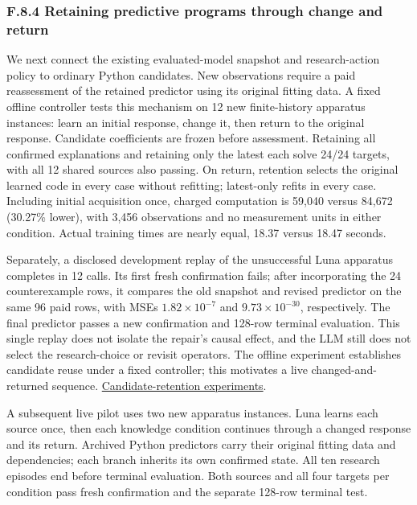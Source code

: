 \documentclass[twoside,11pt]{article}
\begin{document}
\subsubsection*{F.8.4 Retaining predictive programs through change and return}

We next connect the existing evaluated-model snapshot and research-action policy
to ordinary Python candidates. New observations require a paid reassessment of
the retained predictor using its original fitting data. A fixed offline controller
tests this mechanism on 12 new finite-history apparatus instances: learn an initial
response, change it, then return to the original response. Candidate coefficients
are frozen before assessment. Retaining all confirmed explanations and retaining
only the latest each solve 24/24 targets, with all 12 shared sources also passing.
On return, retention selects the original learned code in every case without
refitting; latest-only refits in every case. Including initial acquisition once,
charged computation is 59,040 versus 84,672 (30.27\% lower), with 3,456 observations
and no measurement units in either condition. Actual training times are nearly
equal, 18.37 versus 18.47 seconds.


Separately, a disclosed development replay of the unsuccessful Luna apparatus
completes in 12 calls. Its first fresh confirmation fails; after incorporating the
24 counterexample rows, it compares the old snapshot and revised predictor on
the same 96 paid rows, with MSEs \(1.82\times10^{-7}\) and \(9.73\times10^{-30}\),
respectively. The final predictor passes a new confirmation and 128-row terminal
evaluation. This single replay does not isolate the repair's causal effect, and
the LLM still does not select the research-choice or revisit operators. The
offline experiment establishes candidate reuse under a fixed controller;
this motivates a live changed-and-returned sequence.
\hyperlink{artifact-79}{Candidate-retention experiments}.


A subsequent live pilot uses two new apparatus instances. Luna learns each source
once, then each knowledge condition continues through a changed response and its
return. Archived Python predictors carry their original fitting data and dependencies;
each branch inherits its own confirmed state. All ten research episodes end before
terminal evaluation. Both sources and all four targets per condition pass fresh
confirmation and the separate 128-row terminal test.
\end{document}
